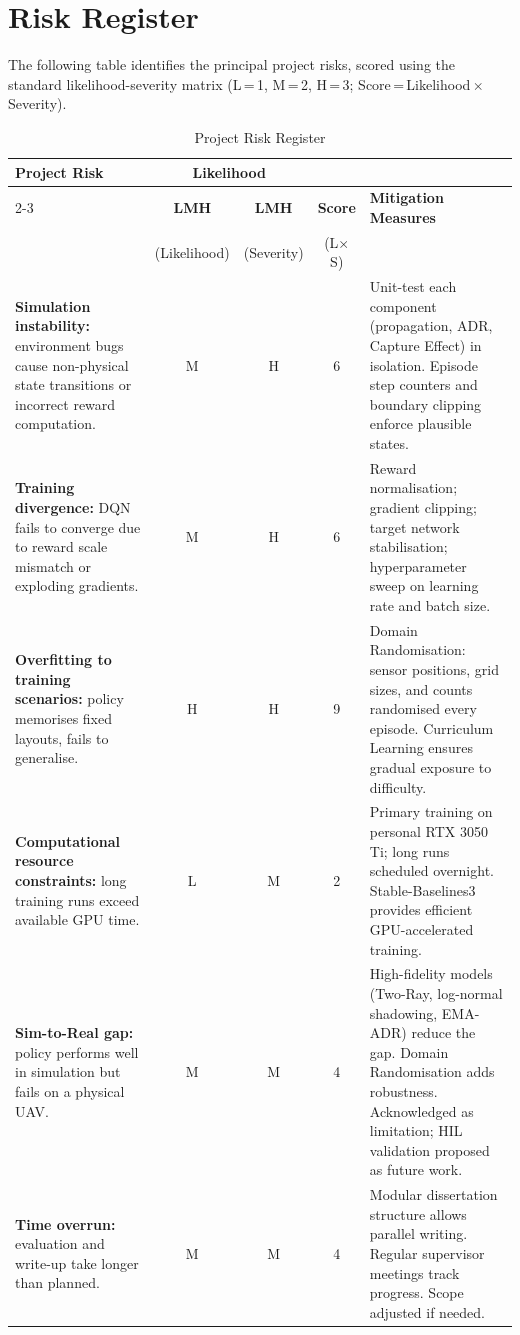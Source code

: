 \section{Risk Register}
\label{app:risk}

The following table identifies the principal project risks, scored using the standard
likelihood-severity matrix (L\,=\,1, M\,=\,2, H\,=\,3; Score\,=\,Likelihood\,$\times$\,Severity).

\begin{table}[H]
\centering
\caption{Project Risk Register}
\label{tab:risk}
\small
\begin{tabularx}{\textwidth}{p{3.6cm} c c c X}
\toprule
\textbf{Project Risk} &
\multicolumn{2}{c}{\textbf{Likelihood}} &
\multicolumn{2}{c}{\hspace{-1cm}} \\
\cmidrule(lr){2-3}
 & \textbf{L\;M\;H} & \textbf{L\;M\;H} & \textbf{Score} & \textbf{Mitigation Measures} \\
 & \small(Likelihood) & \small(Severity) & \small(L$\times$S) & \\
\midrule
\textbf{Simulation instability:} environment bugs cause non-physical state transitions or incorrect reward computation.
& M & H & 6 &
Unit-test each component (propagation, ADR, Capture Effect) in isolation. Episode step counters and boundary clipping enforce plausible states. \\
\midrule
\textbf{Training divergence:} DQN fails to converge due to reward scale mismatch or exploding gradients.
& M & H & 6 &
Reward normalisation; gradient clipping; target network stabilisation; hyperparameter sweep on learning rate and batch size. \\
\midrule
\textbf{Overfitting to training scenarios:} policy memorises fixed layouts, fails to generalise.
& H & H & 9 &
Domain Randomisation: sensor positions, grid sizes, and counts randomised every episode. Curriculum Learning ensures gradual exposure to difficulty. \\
\midrule
\textbf{Computational resource constraints:} long training runs exceed available GPU time.
& L & M & 2 &
Primary training on personal RTX 3050 Ti; long runs scheduled overnight. Stable-Baselines3 provides efficient GPU-accelerated training. \\
\midrule
\textbf{Sim-to-Real gap:} policy performs well in simulation but fails on a physical UAV.
& M & M & 4 &
High-fidelity models (Two-Ray, log-normal shadowing, EMA-ADR) reduce the gap. Domain Randomisation adds robustness. Acknowledged as limitation; HIL validation proposed as future work. \\
\midrule
\textbf{Time overrun:} evaluation and write-up take longer than planned.
& M & M & 4 &
Modular dissertation structure allows parallel writing. Regular supervisor meetings track progress. Scope adjusted if needed. \\
\bottomrule
\end{tabularx}
\end{table}

